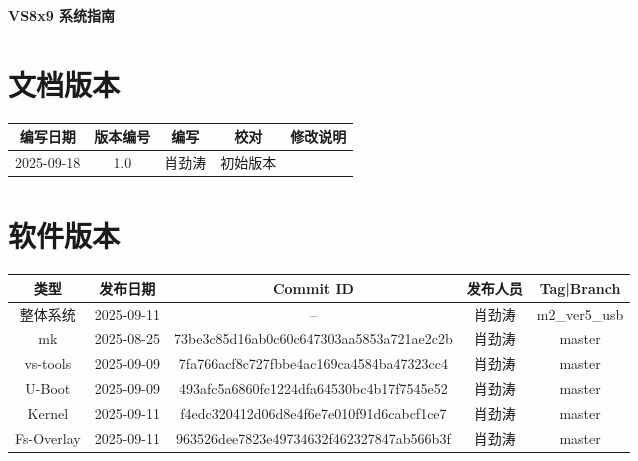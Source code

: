 \documentclass[UTF8]{ctexart}
\begin{document}
\pagestyle{empty}

\begin{center}
    \vspace*{2cm}
    {\Huge \textbf{VS8x9 系统指南}}
    \vspace{2cm}
\end{center}

\section*{文档版本}

\begin{center}
    \begin{tabular}{|*{5}{c|}} \hline
        编写日期 & 版本编号 & 编写 & 校对 & 修改说明 \\ \hline
        2025-09-18 & 1.0 & 肖劲涛  & 初始版本 \\ \hline
    \end{tabular}
\end{center}

\vspace{1cm}

\section*{软件版本}

\begin{center}
    \begin{tabular}{|*{5}{c|}} \hline
        类型 & 发布日期 & Commit ID & 发布人员 & Tag|Branch \\ \hline
        整体系统 & 2025-09-11 & -- & 肖劲涛 & m2\_ver5\_usb  \\ \hline
        mk & 2025-08-25 & 73be3c85d16ab0c60c647303aa5853a721ae2c2b & 肖劲涛  & master \\ \hline
        vs-tools & 2025-09-09 & 7fa766acf8c727fbbe4ac169ca4584ba47323cc4 & 肖劲涛  & master \\ \hline
        U-Boot & 2025-09-09 & 493afc5a6860fc1224dfa64530bc4b17f7545e52 & 肖劲涛  & master \\ \hline
        Kernel & 2025-09-11 & f4edc320412d06d8e4f6e7e010f91d6cabcf1ce7 & 肖劲涛  & master \\ \hline
        Fs-Overlay & 2025-09-11 & 963526dee7823e49734632f462327847ab566b3f & 肖劲涛  & master \\ \hline
    \end{tabular}
\end{center}
\end{document}
